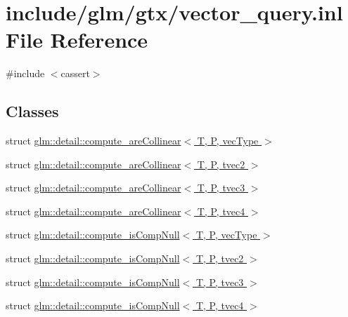 \hypertarget{vector__query_8inl}{}\section{include/glm/gtx/vector\+\_\+query.inl File Reference}
\label{vector__query_8inl}
{\ttfamily \#include $<$cassert$>$}\newline
\subsection*{Classes}
\begin{DoxyCompactItemize}
\item 
struct \hyperlink{structglm_1_1detail_1_1compute__areCollinear}{glm\+::detail\+::compute\+\_\+are\+Collinear$<$ T, P, vec\+Type $>$}
\item 
struct \hyperlink{structglm_1_1detail_1_1compute__areCollinear_3_01T_00_01P_00_01tvec2_01_4}{glm\+::detail\+::compute\+\_\+are\+Collinear$<$ T, P, tvec2 $>$}
\item 
struct \hyperlink{structglm_1_1detail_1_1compute__areCollinear_3_01T_00_01P_00_01tvec3_01_4}{glm\+::detail\+::compute\+\_\+are\+Collinear$<$ T, P, tvec3 $>$}
\item 
struct \hyperlink{structglm_1_1detail_1_1compute__areCollinear_3_01T_00_01P_00_01tvec4_01_4}{glm\+::detail\+::compute\+\_\+are\+Collinear$<$ T, P, tvec4 $>$}
\item 
struct \hyperlink{structglm_1_1detail_1_1compute__isCompNull}{glm\+::detail\+::compute\+\_\+is\+Comp\+Null$<$ T, P, vec\+Type $>$}
\item 
struct \hyperlink{structglm_1_1detail_1_1compute__isCompNull_3_01T_00_01P_00_01tvec2_01_4}{glm\+::detail\+::compute\+\_\+is\+Comp\+Null$<$ T, P, tvec2 $>$}
\item 
struct \hyperlink{structglm_1_1detail_1_1compute__isCompNull_3_01T_00_01P_00_01tvec3_01_4}{glm\+::detail\+::compute\+\_\+is\+Comp\+Null$<$ T, P, tvec3 $>$}
\item 
struct \hyperlink{structglm_1_1detail_1_1compute__isCompNull_3_01T_00_01P_00_01tvec4_01_4}{glm\+::detail\+::compute\+\_\+is\+Comp\+Null$<$ T, P, tvec4 $>$}
\end{DoxyCompactItemize}
